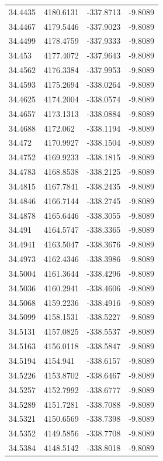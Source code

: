 \begin{table}[H]
\begin{tabular}{llll}
34.4435 & 4180.6131 & -337.8713 & -9.8089 \\
34.4467 & 4179.5446 & -337.9023 & -9.8089 \\
34.4499 & 4178.4759 & -337.9333 & -9.8089 \\
34.453 & 4177.4072 & -337.9643 & -9.8089 \\
34.4562 & 4176.3384 & -337.9953 & -9.8089 \\
34.4593 & 4175.2694 & -338.0264 & -9.8089 \\
34.4625 & 4174.2004 & -338.0574 & -9.8089 \\
34.4657 & 4173.1313 & -338.0884 & -9.8089 \\
34.4688 & 4172.062 & -338.1194 & -9.8089 \\
34.472 & 4170.9927 & -338.1504 & -9.8089 \\
34.4752 & 4169.9233 & -338.1815 & -9.8089 \\
34.4783 & 4168.8538 & -338.2125 & -9.8089 \\
34.4815 & 4167.7841 & -338.2435 & -9.8089 \\
34.4846 & 4166.7144 & -338.2745 & -9.8089 \\
34.4878 & 4165.6446 & -338.3055 & -9.8089 \\
34.491 & 4164.5747 & -338.3365 & -9.8089 \\
34.4941 & 4163.5047 & -338.3676 & -9.8089 \\
34.4973 & 4162.4346 & -338.3986 & -9.8089 \\
34.5004 & 4161.3644 & -338.4296 & -9.8089 \\
34.5036 & 4160.2941 & -338.4606 & -9.8089 \\
34.5068 & 4159.2236 & -338.4916 & -9.8089 \\
34.5099 & 4158.1531 & -338.5227 & -9.8089 \\
34.5131 & 4157.0825 & -338.5537 & -9.8089 \\
34.5163 & 4156.0118 & -338.5847 & -9.8089 \\
34.5194 & 4154.941 & -338.6157 & -9.8089 \\
34.5226 & 4153.8702 & -338.6467 & -9.8089 \\
34.5257 & 4152.7992 & -338.6777 & -9.8089 \\
34.5289 & 4151.7281 & -338.7088 & -9.8089 \\
34.5321 & 4150.6569 & -338.7398 & -9.8089 \\
34.5352 & 4149.5856 & -338.7708 & -9.8089 \\
34.5384 & 4148.5142 & -338.8018 & -9.8089 \\

\end{tabular}
\end{table}
